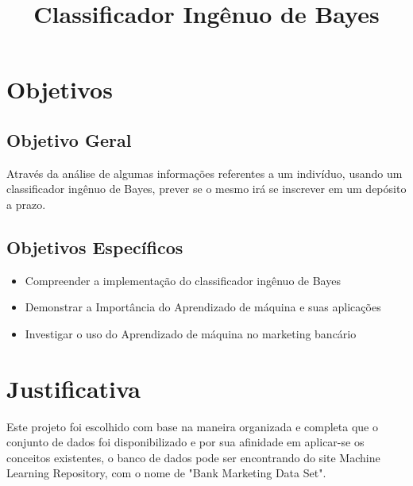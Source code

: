 \documentclass[conference]{IEEEtran}
\begin{document}
\title{Classificador Ingênuo de Bayes}

\author{
\and
{}
\and
{}

}

\maketitle





\section{Objetivos}
\subsection{Objetivo Geral}
Através da análise de algumas informações referentes a um indivíduo, usando um classificador ingênuo de Bayes, prever se o mesmo irá se inscrever em um depósito a prazo. 
\subsection{Objetivos Específicos}
\begin{itemize}
\item Compreender a implementação do classificador ingênuo de Bayes
\item Demonstrar a Importância do Aprendizado de máquina e suas aplicações
\item Investigar o uso do Aprendizado de máquina no marketing bancário
\end{itemize}
\section{Justificativa}
Este projeto foi escolhido com base na maneira organizada e completa que o conjunto de dados  foi disponibilizado e por sua afinidade em aplicar-se os conceitos existentes, o banco de dados pode ser encontrando do site Machine Learning Repository, com o nome de "Bank Marketing Data Set"\cite{b1}.
\end{document}

